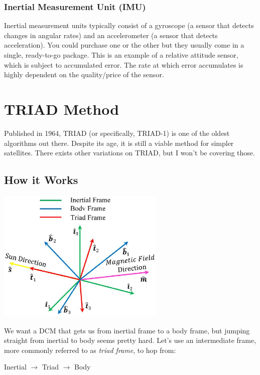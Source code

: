\documentclass[a4paper,14pt]{extreport}
\begin{document}
\subsection{Inertial Measurement Unit (IMU)}
Inertial measurement units typically consist of a gyroscope (a sensor that detects changes in angular rates) and an accelerometer (a sensor that detects acceleration). You could purchase one or the other but they usually come in a single, ready-to-go package. This is an example of a relative attitude sensor, which is subject to accumulated error. The rate at which error accumulates is highly dependent on the quality/price of the sensor.
\chapter{TRIAD Method}
Published in 1964, TRIAD (or specifically, TRIAD-1) is one of the oldest algorithms out there. Despite its age, it is still a viable method for simpler satellites. There exists other variations on TRIAD, but I won't be covering those.

\section{How it Works}
\begin{center}
\includegraphics[width=8cm]{triad}
\end{center}
We want a DCM that gets us from inertial frame to a body frame, but jumping straight from inertial to body seems pretty hard. Let's use an intermediate frame, more commonly referred to as \emph{triad frame}, to hop from:
\begin{center}Inertial $\rightarrow$ Triad $\rightarrow$ Body\end{center}
\end{document}
